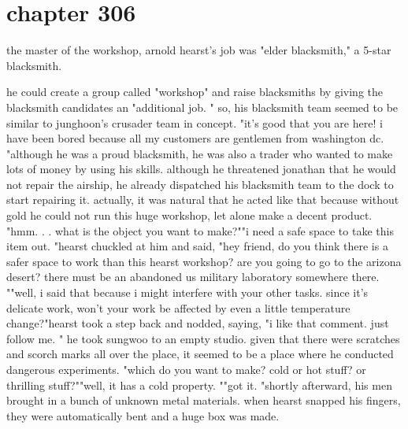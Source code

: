 \section{chapter 306}

the master of the workshop, arnold hearst's job was "elder blacksmith," a 5-star blacksmith.





he could create a group called "workshop" and raise blacksmiths by giving the blacksmith candidates an "additional job.
" so, his blacksmith team seemed to be similar to junghoon's crusader team in concept.
 "it's good that you are here! i have been bored because all my customers are gentlemen from washington dc.
"although he was a proud blacksmith, he was also a trader who wanted to make lots of money by using his skills.
 although he threatened jonathan that he would not repair the airship, he already dispatched his blacksmith team to the dock to start repairing it.
 actually, it was natural that he acted like that because without gold he could not run this huge workshop, let alone make a decent product.
"hmm.
.
.
 what is the object you want to make?""i need a safe space to take this item out.
"hearst chuckled at him and said, "hey friend, do you think there is a safer space to work than this hearst workshop? are you going to go to the arizona desert? there must be an abandoned us military laboratory somewhere there.
""well, i said that because i might interfere with your other tasks.
 since it's delicate work, won't your work be affected by even a little temperature change?"hearst took a step back and nodded, saying, "i like that comment.
 just follow me.
" he took sungwoo to an empty studio.
 given that there were scratches and scorch marks all over the place, it seemed to be a place where he conducted dangerous experiments.
"which do you want to make? cold or hot stuff? or thrilling stuff?""well, it has a cold property.
""got it.
"shortly afterward, his men brought in a bunch of unknown metal materials.
 when hearst snapped his fingers, they were automatically bent and a huge box was made.

